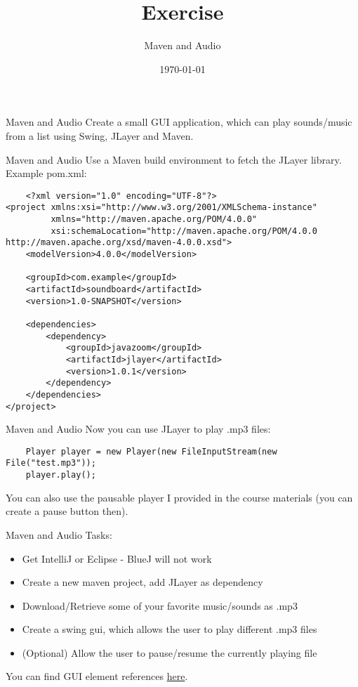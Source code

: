 


\title{Exercise}
\subtitle{Maven and Audio}
\date{\today}




\begin{frame}
    \titlepage
\end{frame}

\begin{frame}[fragile]{Maven and Audio}
    Create a small GUI application, which can play sounds/music from a list using Swing, JLayer and Maven.
\end{frame}

\begin{frame}{Maven and Audio}
    Use a Maven build environment to fetch the JLayer library. Example pom.xml:
    \begin{lstlisting}
    <?xml version="1.0" encoding="UTF-8"?>
<project xmlns:xsi="http://www.w3.org/2001/XMLSchema-instance"
         xmlns="http://maven.apache.org/POM/4.0.0"
         xsi:schemaLocation="http://maven.apache.org/POM/4.0.0 http://maven.apache.org/xsd/maven-4.0.0.xsd">
    <modelVersion>4.0.0</modelVersion>

    <groupId>com.example</groupId>
    <artifactId>soundboard</artifactId>
    <version>1.0-SNAPSHOT</version>

    <dependencies>
        <dependency>
            <groupId>javazoom</groupId>
            <artifactId>jlayer</artifactId>
            <version>1.0.1</version>
        </dependency>
    </dependencies>
</project>\end{lstlisting}
\end{frame}

\begin{frame}{Maven and Audio}
    Now you can use JLayer to play .mp3 files:
    \begin{lstlisting}
    Player player = new Player(new FileInputStream(new File("test.mp3"));
    player.play();
    \end{lstlisting}
    You can also use the pausable player I provided in the course materials (you can create a pause button then).
\end{frame}

\begin{frame}{Maven and Audio}
    Tasks:
    \begin{itemize}
        \item Get IntelliJ or Eclipse - BlueJ will not work
        \item Create a new maven project, add JLayer as dependency
        \item Download/Retrieve some of your favorite music/sounds as .mp3
        \item Create a swing gui, which allows the user to play different .mp3 files
        \item (Optional) Allow the user to pause/resume the currently playing file
    \end{itemize}
    You can find GUI element references \href{http://www.java-tutorial.org/swing.html}{here}.
\end{frame}



